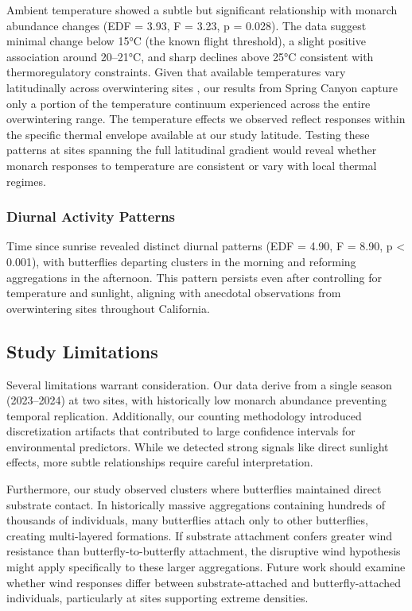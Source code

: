 Ambient temperature showed a subtle but significant relationship with monarch abundance changes (EDF = 3.93, F = 3.23, p = 0.028). The data suggest minimal change below 15°C (the known flight threshold), a slight positive association around 20--21°C, and sharp declines above 25°C consistent with thermoregulatory constraints. Given that available temperatures vary latitudinally across overwintering sites \autocite{Saniee2022_3VN7I68M}, our results from Spring Canyon capture only a portion of the temperature continuum experienced across the entire overwintering range. The temperature effects we observed reflect responses within the specific thermal envelope available at our study latitude. Testing these patterns at sites spanning the full latitudinal gradient would reveal whether monarch responses to temperature are consistent or vary with local thermal regimes.

\subsubsection{Diurnal Activity Patterns}

Time since sunrise revealed distinct diurnal patterns (EDF = 4.90, F = 8.90, p < 0.001), with butterflies departing clusters in the morning and reforming aggregations in the afternoon. This pattern persists even after controlling for temperature and sunlight, aligning with anecdotal observations from overwintering sites throughout California.

\subsection{Study Limitations}

Several limitations warrant consideration. Our data derive from a single season (2023--2024) at two sites, with historically low monarch abundance preventing temporal replication. Additionally, our counting methodology introduced discretization artifacts that contributed to large confidence intervals for environmental predictors. While we detected strong signals like direct sunlight effects, more subtle relationships require careful interpretation.

Furthermore, our study observed clusters where butterflies maintained direct substrate contact. In historically massive aggregations containing hundreds of thousands of individuals, many butterflies attach only to other butterflies, creating multi-layered formations. If substrate attachment confers greater wind resistance than butterfly-to-butterfly attachment, the disruptive wind hypothesis might apply specifically to these larger aggregations. Future work should examine whether wind responses differ between substrate-attached and butterfly-attached individuals, particularly at sites supporting extreme densities.

